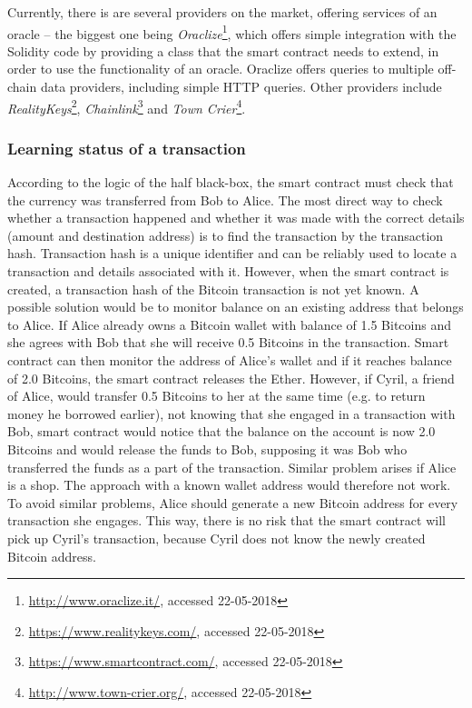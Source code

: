 Currently, there is are several providers on the market, offering services of an oracle -- the biggest one being \textit{Oraclize}\footnote{\url{http://www.oraclize.it/}, accessed 22-05-2018}, which offers simple integration with the Solidity code by providing a class that the smart contract needs to extend, in order to use the functionality of an oracle. Oraclize offers queries to multiple off-chain data providers, including simple HTTP queries. Other providers include \textit{RealityKeys}\footnote{\url{https://www.realitykeys.com/}, accessed 22-05-2018}, \textit{Chainlink}\footnote{\url{https://www.smartcontract.com/}, accessed 22-05-2018} and \textit{Town Crier}\footnote{\url{http://www.town-crier.org/}, accessed 22-05-2018}.
% 

\subsubsection{Learning status of a transaction}
According to the logic of the half black-box, the smart contract must check that the currency was transferred from Bob to Alice. The most direct way to check whether a transaction happened and whether it was made with the correct details (amount and destination address) is to find the transaction by the transaction hash. Transaction hash is a unique identifier and can be reliably used to locate a transaction and details associated with it. However, when the smart contract is created, a transaction hash of the Bitcoin transaction is not yet known.
% 
A possible solution would be to monitor balance on an existing address that belongs to Alice. If Alice already owns a Bitcoin wallet with balance of 1.5 Bitcoins and she agrees with Bob that she will receive 0.5 Bitcoins in the transaction. Smart contract can then monitor the address of Alice's wallet and if it reaches balance of 2.0 Bitcoins, the smart contract releases the Ether. However, if Cyril, a friend of Alice, would transfer 0.5 Bitcoins to her at the same time (e.g. to return money he borrowed earlier), not knowing that she engaged in a transaction with Bob, smart contract would notice that the balance on the account is now 2.0 Bitcoins and would release the funds to Bob, supposing it was Bob who transferred the funds as a part of the transaction. Similar problem arises if Alice is a shop. The approach with a known wallet address would therefore not work. To avoid similar problems, Alice should generate a new Bitcoin address for every transaction she engages. This way, there is no risk that the smart contract will pick up Cyril's transaction, because Cyril does not know the newly created Bitcoin address\footnotemark.
% 
